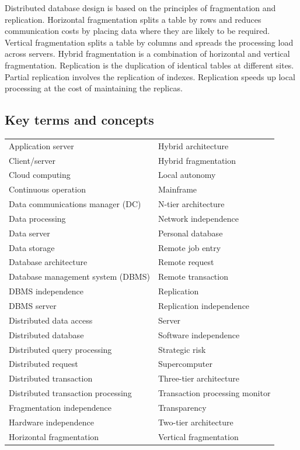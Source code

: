 \documentclass[
]{article}
\begin{document}
Distributed database design is based on the principles of fragmentation
and replication. Horizontal fragmentation splits a table by rows and
reduces communication costs by placing data where they are likely to be
required. Vertical fragmentation splits a table by columns and spreads
the processing load across servers. Hybrid fragmentation is a
combination of horizontal and vertical fragmentation. Replication is the
duplication of identical tables at different sites. Partial replication
involves the replication of indexes. Replication speeds up local
processing at the cost of maintaining the replicas.

\hypertarget{key-terms-and-concepts-9}{%
\subsection*{Key terms and concepts}\label{key-terms-and-concepts-9}}

\begin{longtable}[]{@{}ll@{}}
\toprule
& \\
\midrule
\endhead
Application server & Hybrid architecture \\
Client/server & Hybrid fragmentation \\
Cloud computing & Local autonomy \\
Continuous operation & Mainframe \\
Data communications manager (DC) & N-tier architecture \\
Data processing & Network independence \\
Data server & Personal database \\
Data storage & Remote job entry \\
Database architecture & Remote request \\
Database management system (DBMS) & Remote transaction \\
DBMS independence & Replication \\
DBMS server & Replication independence \\
Distributed data access & Server \\
Distributed database & Software independence \\
Distributed query processing & Strategic risk \\
Distributed request & Supercomputer \\
Distributed transaction & Three-tier architecture \\
Distributed transaction processing & Transaction processing monitor \\
Fragmentation independence & Transparency \\
Hardware independence & Two-tier architecture \\
Horizontal fragmentation & Vertical fragmentation \\
\bottomrule
\end{longtable}
\end{document}
